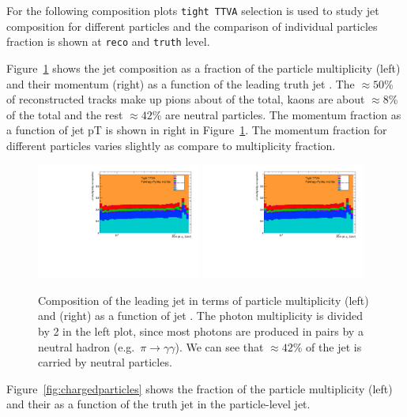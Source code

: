 For the following composition plots \texttt{tight TTVA} selection is used to study jet composition for different particles and the comparison of individual particles fraction is shown at \texttt{reco} and \texttt{truth} level.

Figure~\ref{fig:truthJetComp} shows the jet composition as a fraction of the particle multiplicity (left) and their momentum (right) as a function of the leading truth jet \pT{}. The $\approx 50$\% of reconstructed tracks make up pions about of the total, kaons are about $\approx 8$\% of the total and the rest $\approx 42$\% are neutral particles. The momentum fraction as a function of jet pT is shown in right in Figure~\ref{fig:truthJetComp}. The momentum fraction for different particles varies slightly as compare to multiplicity fraction.

\begin{figure}[b]
\centering
\includegraphics[width=0.48\textwidth,page=1]{figures/jet_comp_study_fixedGamma.pdf}
\includegraphics[width=0.48\textwidth,page=2]{figures/jet_comp_study_fixedGamma.pdf}%
\caption{Composition of the leading jet in terms of particle multiplicity (left) and \pt{} (right) as a function of jet \pt{}. The photon multiplicity is divided by 2 in the left plot, since most photons are produced in pairs by a neutral hadron (e.g.\ $\pi\to\gamma\gamma$).
We can see that $\approx 42$\% of the jet \pt{} is carried by neutral particles.}
\label{fig:truthJetComp}
\end{figure}

Figure~\ref{fig:chargedparticles} shows the fraction of the particle multiplicity (left) and their \pT{} as a function of the truth jet \pT in the particle-level jet. 


